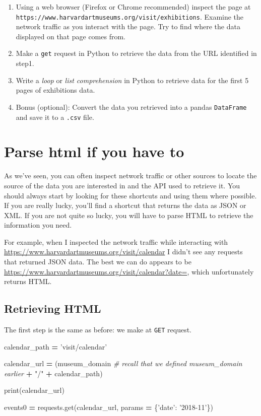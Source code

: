 \documentclass[]{book}
\newenvironment{Shaded}{\begin{snugshade}}{\end{snugshade}}
\newcommand{\StringTok}[1]{\textcolor[rgb]{0.31,0.60,0.02}{#1}}
\newcommand{\CommentTok}[1]{\textcolor[rgb]{0.56,0.35,0.01}{\textit{#1}}}
\newcommand{\OperatorTok}[1]{\textcolor[rgb]{0.81,0.36,0.00}{\textbf{#1}}}
\newcommand{\BuiltInTok}[1]{#1}
\newcommand{\NormalTok}[1]{#1}
\providecommand{\tightlist}{%
  \setlength{\itemsep}{0pt}\setlength{\parskip}{0pt}}
\begin{document}
\begin{enumerate}
\def\labelenumi{\arabic{enumi}.}
\tightlist
\item
  Using a web browser (Firefox or Chrome recommended) inspect the page
  at \texttt{https://www.harvardartmuseums.org/visit/exhibitions}.
  Examine the network traffic as you interact with the page. Try to find
  where the data displayed on that page comes from.
\item
  Make a \texttt{get} request in Python to retrieve the data from the
  URL identified in step1.
\item
  Write a \emph{loop} or \emph{list comprehension} in Python to retrieve
  data for the first 5 pages of exhibitions data.
\item
  Bonus (optional): Convert the data you retrieved into a pandas
  \texttt{DataFrame} and save it to a \texttt{.csv} file.
\end{enumerate}

\section{Parse html if you have to}\label{parse-html-if-you-have-to}

As we've seen, you can often inspect network traffic or other sources to
locate the source of the data you are interested in and the API used to
retrieve it. You should always start by looking for these shortcuts and
using them where possible. If you are really lucky, you'll find a
shortcut that returns the data as JSON or XML. If you are not quite so
lucky, you will have to parse HTML to retrieve the information you need.

For example, when I inspected the network traffic while interacting with
\url{https://www.harvardartmuseums.org/visit/calendar} I didn't see any
requests that returned JSON data. The best we can do appears to be
\url{https://www.harvardartmuseums.org/visit/calendar?date=}, which
unfortunately returns HTML.

\subsection{Retrieving HTML}\label{retrieving-html}

The first step is the same as before: we make at \texttt{GET} request.

\begin{Shaded}
\begin{Highlighting}[]
\NormalTok{calendar_path }\OperatorTok{=} \StringTok{'visit/calendar'}

\NormalTok{calendar_url }\OperatorTok{=}\NormalTok{ (museum_domain }\CommentTok{# recall that we defined museum_domain earlier}
                  \OperatorTok{+} \StringTok{"/"}
                  \OperatorTok{+}\NormalTok{ calendar_path)}

\BuiltInTok{print}\NormalTok{(calendar_url)}

\NormalTok{events0 }\OperatorTok{=}\NormalTok{ requests.get(calendar_url, params }\OperatorTok{=}\NormalTok{ \{}\StringTok{'date'}\NormalTok{: }\StringTok{'2018-11'}\NormalTok{\})}
\end{Highlighting}
\end{Shaded}
\end{document}
